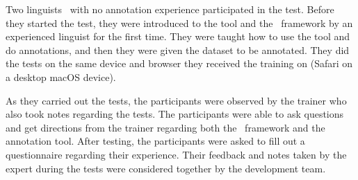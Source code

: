 Two linguists~\cite{anon} with no annotation experience participated in the test.
Before they started the test, they were introduced to the tool and the \ud\ framework by an experienced linguist for the first time.
They were taught how to use the tool and do annotations, and then they were given the dataset to be annotated.
They did the tests on the same device and browser they received the training on (Safari on a desktop macOS device).

As they carried out the tests, the participants were observed by the trainer who also took notes regarding the tests.
The participants were able to ask questions and get directions from the trainer regarding both the \ud\ framework and the annotation tool.
After testing, the participants were asked to fill out a questionnaire regarding their experience.
Their feedback and notes taken by the expert during the tests were considered together by the development team.